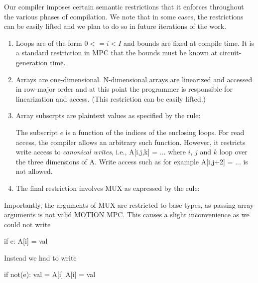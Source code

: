 Our compiler imposes certain semantic restrictions that it enforces throughout the various
phases of compilation. We note that in some cases, the restrictions
can be easily lifted and we plan to do so in future iterations of the work.

\begin{enumerate}
\item Loops are of the form $0 <= i < I$ and bounds are fixed at compile time.
It is a standard restriction in MPC that the bounds must be known at circuit-generation time.
\item Arrays are one-dimensional. N-dimensional arrays are linearized and accessed
in row-major order and at this point the programmer is responsible for linearization
and access. (This restriction can be easily lifted.)
\item Array subscrpts are plaintext values as specified by the rule:
\begin{semantics}
\end{semantics}
The subscript $e$ is a function of the indices of the enclosing loops.
For read access, the compiler allows an arbitrary such function.
However, it restricts write access to \emph{canonical writes}, i.e., {\sf A[i,j,k] = ...}
where $i$, $j$ and $k$ loop over the three dimensions of {\sf A}.
Write access such as for example {\sf A[i,j+2] = ...} is not allowed.
\item The final restriction involves MUX as expressed by the rule:
\begin{semantics}
\end{semantics}
\end{enumerate}
Importantly, the arguments of MUX are restricted to base types, as passing array arguments
is not valid MOTION MPC.  This causes a slight inconvenience as we could not write
\begin{pythonn}
if e: A[i] = val
\end{pythonn}
Instead we had to write
\begin{pythonn}
if not(e): val = A[i]
A[i] = val
\end{pythonn}

